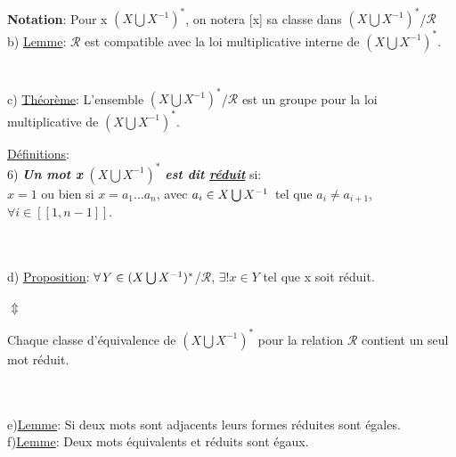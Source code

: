 \documentclass{article}
\begin{document}
 \\


\textbf{Notation}: Pour x \in $(X\bigcup X^{-1})^{*}$, on notera [x] sa classe dans $(X\bigcup X^{-1})^{*}$/$\mathcal{R}$
\\

\parindent 0mm b) \underline{Lemme}:
$\mathcal{R}$ est compatible avec la loi multiplicative interne de $(X\bigcup X^{-1})^{*}$.\\


\\

\\ \parindent 0mm c) \underline{Théorème}:
L'ensemble $(X\bigcup X^{-1})^{*}$/$\mathcal{R}$ est un groupe pour la loi multiplicative de $(X \bigcup X^{-1})^{*}$.\\



\begin{definitionbox}
\underline{Définitions}:
\\

6) \textbf{\textit{Un mot x}} \in $(X \bigcup X^{-1})^{*}$ \textbf{\textit{est dit \underline{réduit}}} si:\\
$x=1$ ou bien si $x=a_1 \dots a_n$, avec $a_i \in X \bigcup X^{-1} \hspace{0.05cm}$ tel que $a_i \neq a_{i+1}$, $\forall i \in [\![1,n-1]\!]$.

\end{definitionbox}
\\~\\
d) \underline{Proposition}: $\forall \hspace{0.05cm} Y \in (X\bigcup X^{-1})^{*}$/$\mathcal{R}$, $\exists! x \in Y$ tel que x soit réduit.
\begin{center}
    $\Updownarrow$
\end{center}
\begin{center}
Chaque classe d'équivalence de $(X \bigcup X^{-1})^{*}$ pour la relation $\mathcal{R}$ contient un seul mot réduit.
\end{center} \\~\\



e)\underline{Lemme}:
Si deux mots sont adjacents leurs formes réduites sont égales.
\\


f)\underline{Lemme}: Deux mots équivalents et réduits sont égaux.
\\
\end{document}
